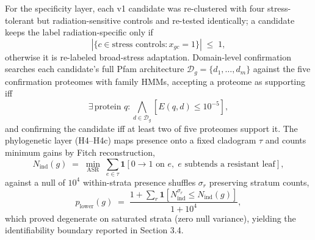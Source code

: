 \documentclass[12pt,a4paper]{article}
\begin{document}
For the specificity layer, each v1 candidate was re-clustered with four stress-tolerant but radiation-sensitive controls and re-tested identically; a candidate keeps the label radiation-specific only if
\begin{equation}
\left| \{ c \in \text{stress controls} : x_{gc} = 1 \} \right| \;\le\; 1,
\end{equation}
otherwise it is re-labeled broad-stress adaptation. Domain-level confirmation searches each candidate's full Pfam architecture $\mathcal{D}_g = \{d_1, \dots, d_m\}$ against the five confirmation proteomes with family HMMs, accepting a proteome as supporting iff
\begin{equation}
\exists\, \text{protein } q : \bigwedge_{d \in \mathcal{D}_g} \left[ E(q, d) \le 10^{-5} \right],
\end{equation}
and confirming the candidate iff at least two of five proteomes support it. The phylogenetic layer (H4--H4c) maps presence onto a fixed cladogram $\tau$ and counts minimum gains by Fitch reconstruction,
\begin{equation}
N_{\text{ind}}(g) \;=\; \min_{\text{ASR}} \; \sum_{e \in \tau} \mathbf{1}\!\left[ 0 \to 1 \text{ on } e,\; e \text{ subtends a resistant leaf} \right],
\end{equation}
against a null of $10^{4}$ within-strata presence shuffles $\sigma_r$ preserving stratum counts,
\begin{equation}
p_{\text{lower}}(g) \;=\; \frac{1 + \sum_{r} \mathbf{1}\!\left[ N_{\text{ind}}^{\sigma_r} \le N_{\text{ind}}(g) \right]}{1 + 10^{4}},
\end{equation}
which proved degenerate on saturated strata (zero null variance), yielding the identifiability boundary reported in Section 3.4.
\end{document}
